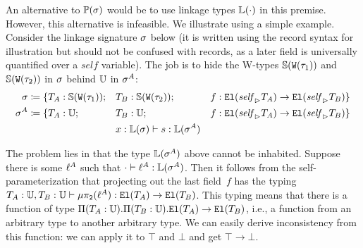 An alternative to $\mathbb{P}({\sigma})$ would be to use linkage types $\mathbb{L}({\cdot})$ in this premise.
However, this alternative is infeasible.
We illustrate using a simple example.
Consider the linkage signature $\sigma$ below (it is written using the record
syntax for illustration but should not be confused with records, as a later field
is universally quantified over a $\mathit{self}$ variable).
The job is to hide the W-types $\mathbb{S}({\texttt{W}({\tau_1})})$ and
$\mathbb{S}({\texttt{W}({\tau_2})})$ in $\sigma$ behind $\mathbb{U}$ in $\sigma^A$:
%
\begin{align*}
  \sigma &\coloneq \{ T_A : \mathbb{S}({\texttt{W}({\tau_1})}); &&T_B : \mathbb{S}({\texttt{W}({\tau_2})}); &&f : \texttt{El}({{\mathit{self}}_{\rhd}{T_A}}) \to \texttt{El}({{\mathit{self}}_{\rhd}{T_B}}) \} \\
  \sigma^A &\coloneq \{T_A : \mathbb{U}; &&T_B : \mathbb{U}; &&f : \texttt{El}({{\mathit{self}}_{\rhd}{T_A}}) \to \texttt{El}({{\mathit{self}}_{\rhd}{T_B}}) \} \\
  & &&  {x : \mathbb{L}({\sigma})} \vdash {\ensuremath{s}} : {\mathbb{L}({\sigma^A})} 
\end{align*}


The problem lies in that the type $\mathbb{L}({\sigma^A})$ above cannot be inhabited.
Suppose there is some $\ell^A$ such that $\cdot \vdash \ell^A : \mathbb{L}({\sigma^A})$.
Then it follows from the self-parameterization that projecting out the last field~$f$
has the typing
$ {T_A : \mathbb{U}, T_B: \mathbb{U}} \vdash {\ensuremath{\mu\pi_{\texttt{2}}({\ell^A})}} : {\texttt{El}({T_A}) \to \texttt{El}({T_B})} $.
This typing means that there is a function of type
$\Pi({T_A}:{\mathbb{U}}).{\Pi({T_B}:{\mathbb{U}}).{\texttt{El}({T_A})
\to \texttt{El}({T_B})}}$, i.e., a function from an arbitrary type to another arbitrary
type. We can easily derive inconsistency from this function:
we can apply it to $\top$ and $\bot$ and get $\top \to \bot$.

